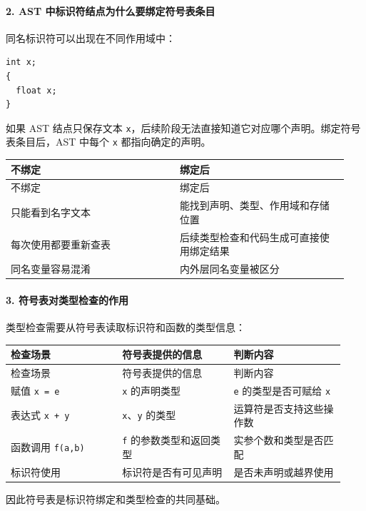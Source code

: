 \documentclass[UTF8]{ctexart}
\begin{document}
\paragraph*{2. AST 中标识符结点为什么要绑定符号表条目}

同名标识符可以出现在不同作用域中：

\begin{Verbatim}[fontsize=\small,breaklines=true]
int x;
{
  float x;
}
\end{Verbatim}

如果 AST 结点只保存文本 \texttt{x}，后续阶段无法直接知道它对应哪个声明。绑定符号表条目后，AST 中每个 \texttt{x} 都指向确定的声明。

\begin{longtable}{|p{0.47\linewidth}|p{0.47\linewidth}|}
\hline
不绑定 & 绑定后 \\
\hline
\endfirsthead
不绑定 & 绑定后 \\
\hline
\endhead
只能看到名字文本 & 能找到声明、类型、作用域和存储位置 \\
\hline
每次使用都要重新查表 & 后续类型检查和代码生成可直接使用绑定结果 \\
\hline
同名变量容易混淆 & 内外层同名变量被区分 \\
\hline
\end{longtable}

\paragraph*{3. 符号表对类型检查的作用}

类型检查需要从符号表读取标识符和函数的类型信息：

\begin{longtable}{|p{0.31\linewidth}|p{0.31\linewidth}|p{0.31\linewidth}|}
\hline
检查场景 & 符号表提供的信息 & 判断内容 \\
\hline
\endfirsthead
检查场景 & 符号表提供的信息 & 判断内容 \\
\hline
\endhead
赋值 \texttt{x = e} & \texttt{x} 的声明类型 & \texttt{e} 的类型是否可赋给 \texttt{x} \\
\hline
表达式 \texttt{x + y} & \texttt{x}、\texttt{y} 的类型 & 运算符是否支持这些操作数 \\
\hline
函数调用 \texttt{f(a,b)} & \texttt{f} 的参数类型和返回类型 & 实参个数和类型是否匹配 \\
\hline
标识符使用 & 标识符是否有可见声明 & 是否未声明或越界使用 \\
\hline
\end{longtable}

因此符号表是标识符绑定和类型检查的共同基础。
\end{document}
